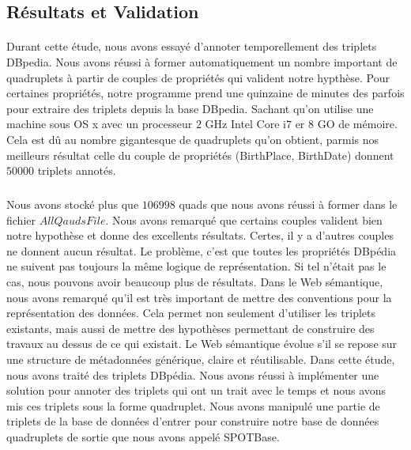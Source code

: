 \subsection{Résultats et Validation}
\paragraph{}
Durant cette étude, nous avons essayé d'annoter temporellement des triplets DBpedia. Nous avons réussi à former automatiquement un nombre important de quadruplets à partir de couples de propriétés qui valident notre hypthèse. Pour certaines propriétés, notre programme prend une quinzaine de minutes des parfois pour extraire des triplets depuis la base DBpedia. Sachant qu'on utilise une machine sous OS x avec un processeur $2$ GHz Intel Core i$7$ er $8$ GO de mémoire. Cela est dû au nombre gigantesque de quadruplets qu'on obtient, parmis nos meilleurs résultat celle du couple de propriétés (BirthPlace, BirthDate) donnent $50000$ triplets annotés.
\subparagraph{}
Nous avons stocké plus que $106998$ quads que nous avons réussi à former dans le fichier $AllQaudsFile$. Nous avons remarqué que certains couples valident bien notre hypothèse et donne des excellents résultats. Certes, il y a d'autres couples ne donnent aucun résultat. Le problème, c'est que toutes les propriétés DBpédia ne suivent pas toujours la même logique de représentation. Si tel n'était pas le cas, nous pouvons avoir beaucoup plus de résultats.
Dans le Web sémantique, nous avons remarqué qu'il est très important de mettre des conventions pour la représentation des données. Cela permet non seulement d'utiliser les triplets existants, mais aussi de mettre des hypothèses permettant de construire des travaux au dessus de ce qui existait. Le Web sémantique évolue s'il se repose sur une structure de métadonnées générique, claire et réutilisable. Dans cette étude, nous avons traité des triplets DBpédia. Nous avons réussi à implémenter une solution pour annoter des triplets qui ont un trait avec le temps et nous avons mis ces triplets sous la forme quadruplet. Nous avons manipulé une partie de triplets de la base de données d'entrer pour construire notre base de données quadruplets de sortie que nous avons appelé SPOTBase.
